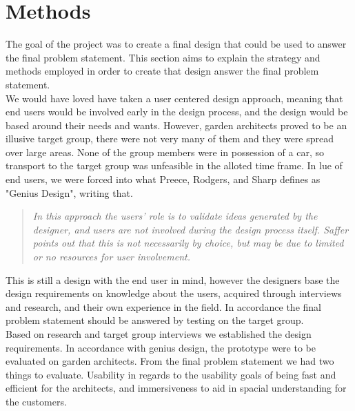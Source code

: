 \chapter{Methods}
The goal of the project was to create a final design that could be used to answer the final problem statement. This section aims to explain the strategy and methods employed in order to create that design answer the final problem statement.\\

We would have loved have taken a user centered design approach, meaning that end users would be involved early in the design process, and the design would be based around their needs and wants. However, garden architects proved to be an illusive target group, there were not very many of them and they were spread over large areas. None of the group members were in possession of a car, so transport to the target group was unfeasible in the alloted time frame. In lue of end users, we were forced into what Preece, Rodgers, and Sharp defines as "Genius Design"\cite[p.~346]{interactionDesign}, writing that.\\
	\begin{quote}
	\textit{In this approach the users’ role is to validate ideas generated by the designer, and users are not involved during the design process itself. Saffer points out that this is not necessarily by choice, but may be due to limited or no resources for user involvement.}\\
	\end{quote}

This is still a design with the end user in mind, however the designers base the design requirements on knowledge about the users, acquired through interviews and research, and their own experience in the field. In accordance the final problem statement should be answered by testing on the target group.\\

Based on research and target group interviews we established the design requirements. In accordance with genius design, the prototype were to be evaluated on garden architects. From the final problem statement we had two things to evaluate. Usability in regards to the usability goals of being fast and efficient for the architects, and immersiveness to aid in spacial understanding for the customers.

